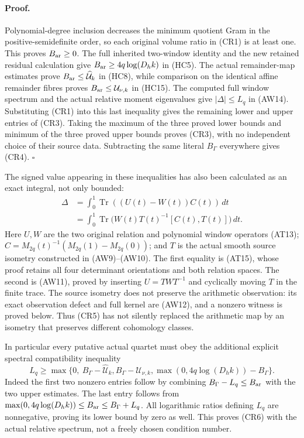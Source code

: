 \paragraph{Proof.}
Polynomial-degree inclusion decreases the minimum quotient Gram in
the positive-semidefinite order, so each original volume ratio in
(CR1) is at least one. This proves $B_{\rm ar}\ge0$.
The full inherited two-window identity and the new retained residual
calculation give $B_{\rm ar}\ge4q\log(D_hk)$ in (HC5).
The actual remainder-map estimates prove
$B_{\rm ar}\le\widehat{\mathcal U}_k$ in (HC8), while comparison
on the identical affine remainder fibres proves
$B_{\rm ar}\le\mathcal U_{\nu,k}$ in (HC15).
The computed full window spectrum and the actual relative moment
eigenvalues give $|\Delta|\le L_q$ in (AW14).
Substituting (CR1) into this last inequality gives the remaining lower
and upper entries of (CR3). Taking the maximum of the three proved
lower bounds and minimum of the three proved upper bounds proves
(CR3), with no independent choice of their source data. Subtracting
the same literal $B_\Gamma$ everywhere gives (CR4).
\hfill$\square$

The signed value appearing in these inequalities has also been
calculated as an exact integral, not only bounded:
\[
\begin{split}
\Delta
 &=\int_0^1\operatorname{Tr}((U(t)-W(t))C(t))\,dt\\
 &=\int_0^1\operatorname{Tr}
       \bigl(W(t)T(t)^{-1}[C(t),T(t)]\bigr)\,dt .
\end{split}                                                   \tag{CR5}
\]
Here $U,W$ are the two original relation and polynomial window
operators (AT13); $C=M_{2q}(t)^{-1}(M_{2q}(1)-M_{2q}(0))$;
and $T$ is the actual smooth source isometry constructed in (AW9)--(AW10).
The first equality is (AT15), whose proof retains all four determinant
orientations and both relation spaces. The second is (AW11), proved
by inserting $U=TWT^{-1}$ and cyclically moving $T$ in the finite
trace. The source isometry does not preserve the arithmetic
observation: its exact observation defect and full kernel are (AW12),
and a nonzero witness is proved below.
Thus (CR5) has not silently replaced the arithmetic map by an isometry
that preserves different cohomology classes.

In particular every putative actual quartet must obey the additional
explicit spectral compatibility inequality
\[
 L_q\ge
 \max\{0,\ B_\Gamma-\widehat{\mathcal U}_k,
              B_\Gamma-\mathcal U_{\nu,k},
              \max(0,4q\log(D_hk))-B_\Gamma\}.          \tag{CR6}
\]
Indeed the first two nonzero entries follow by combining
$B_\Gamma-L_q\le B_{\rm ar}$ with the two upper estimates.
The last entry follows from
$\max(0,4q\log(D_hk))\le B_{\rm ar}\le B_\Gamma+L_q$.
All logarithmic ratios defining $L_q$ are nonnegative, proving its
lower bound by zero as well. This proves (CR6) with the actual relative
spectrum, not a freely chosen condition number.

